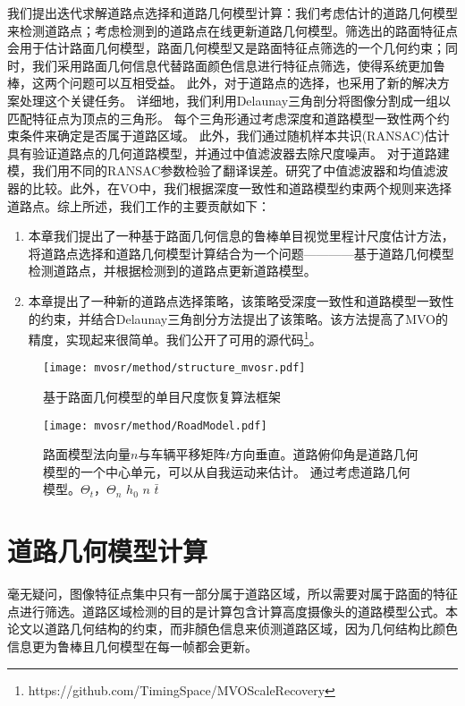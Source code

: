 我们提出迭代求解道路点选择和道路几何模型计算：我们考虑估计的道路几何模型来检测道路点；考虑检测到的道路点在线更新道路几何模型。筛选出的路面特征点会用于估计路面几何模型，路面几何模型又是路面特征点筛选的一个几何约束；同时，我们采用路面几何信息代替路面颜色信息进行特征点筛选，使得系统更加鲁棒，这两个问题可以互相受益。 此外，对于道路点的选择，也采用了新的解决方案处理这个关键任务。 详细地，我们利用Delaunay三角剖分将图像分割成一组以匹配特征点为顶点的三角形。 每个三角形通过考虑深度和道路模型一致性两个约束条件来确定是否属于道路区域。 此外，我们通过随机样本共识(RANSAC)\cite{fischler1981random}估计具有验证道路点的几何道路模型，并通过中值滤波器去除尺度噪声。 对于道路建模，我们用不同的RANSAC参数检验了翻译误差。研究了中值滤波器和均值滤波器的比较。此外，在VO中，我们根据深度一致性和道路模型约束两个规则来选择道路点。综上所述，我们工作的主要贡献如下：
\begin{enumerate}
    \item {本章我们提出了一种基于路面几何信息的鲁棒单目视觉里程计尺度估计方法，将道路点选择和道路几何模型计算结合为一个问题————基于道路几何模型检测道路点，并根据检测到的道路点更新道路模型。}
    \item {本章提出了一种新的道路点选择策略，该策略受深度一致性和道路模型一致性的约束，并结合Delaunay三角剖分方法提出了该策略。该方法提高了MVO的精度，实现起来很简单。我们公开了可用的源代码\footnote{https://github.com/TimingSpace/MVOScaleRecovery}。}
\end{enumerate}

\begin{figure*}
    \centering
    \texttt{[image: mvosr/method/structure\_mvosr.pdf]}
    \caption{基于路面几何模型的单目尺度恢复算法框架}
    \label{fig:structure_mvosr}
\end{figure*}

\begin{figure*}%
    \centering
    \texttt{[image: mvosr/method/RoadModel.pdf]}
    \caption{路面模型法向量$n$与车辆平移矩阵$t$方向垂直。道路俯仰角是道路几何模型的一个中心单元，可以从自我运动来估计。 通过考虑道路几何模型。$\Theta_t$，$\Theta_n$ $h_0$ $n$ $\bar{t}$}
    \label{fig:structure}
\end{figure*}

\section{道路几何模型计算}
\label{sec:road_detection}
毫无疑问，图像特征点集中只有一部分属于道路区域，所以需要对属于路面的特征点进行筛选。道路区域检测的目的是计算包含计算高度摄像头的道路模型公式。本论文以道路几何结构的约束，而非顏色信息来侦测道路区域，因为几何结构比颜色信息更为鲁棒且几何模型在每一帧都会更新。

